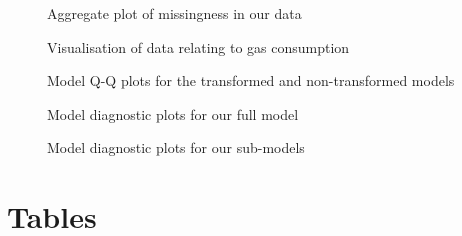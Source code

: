 \documentclass[]{extarticle}
\begin{document}
\begin{figure}[H]
	\centering
	\caption{Aggregate plot of missingness in our data}
	\label{fig:aggrmiss}
\end{figure}

\begin{figure}[H]
	\centering
	\caption{Visualisation of data relating to gas consumption}
	\label{fig:datavis}
\end{figure}


\begin{figure}[H]
	\centering
	\caption{Model Q-Q plots for the transformed and non-transformed models}
	\label{fig:qqplots}
\end{figure}

\begin{figure}[H]
	\centering
	\caption{Model diagnostic plots for our full model}
	\label{fig:fmdiag}
\end{figure}

\begin{figure}[H]
	\centering
	\caption{Model diagnostic plots for our sub-models}
	\label{fig:smdiag}
\end{figure}

\section{Tables}
\end{document}

